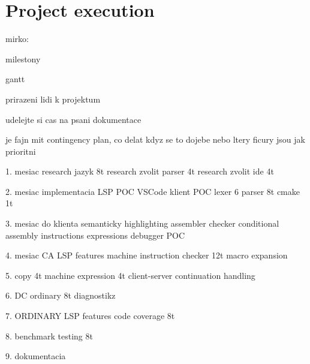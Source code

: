 \chapter{Project execution}

mirko:

milestony

gantt

prirazeni lidi k projektum

udelejte si cas na psani dokumentace

je fajn mit contingency plan, co delat kdyz se to dojebe nebo ltery ficury jsou jak prioritni


1. mesiac 
	research jazyk 8t
	research zvolit parser 4t
	research zvolit ide 4t
	
	
	
2. mesiac
	implementacia LSP POC
		VSCode klient POC
	lexer 6
	parser 8t
	cmake 1t
	
	
	
	
3. mesiac
	do klienta semanticky highlighting
	assembler checker
	conditional assembly 
		instructions
		expressions
	debugger POC
	
	
4. mesiac
	CA LSP features
	machine instruction checker 12t
	macro expansion
	
5. 
	copy 4t
	machine expression 4t
	client-server continuation handling
	
6.
	DC
	ordinary 8t
	diagnostikz
	
	
7.	
	ORDINARY LSP features
	code coverage 8t
	
8. 
	benchmark
	testing 8t	
	
9.
	dokumentacia
